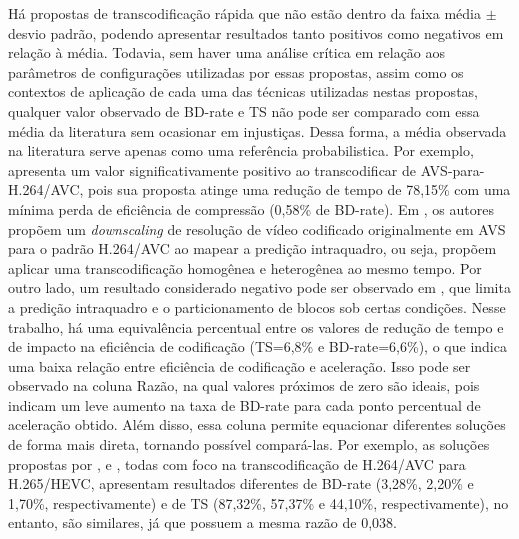 Há propostas de transcodificação rápida que não estão dentro da faixa média $\pm$ desvio padrão, podendo apresentar resultados tanto positivos como negativos em relação à média. Todavia, sem haver uma análise crítica em relação aos parâmetros de configurações utilizadas por essas propostas, assim como os contextos de aplicação de cada uma das técnicas utilizadas nestas propostas, qualquer valor observado de BD-rate e TS não pode ser comparado com essa média da literatura sem ocasionar em injustiças. Dessa forma, a média observada na literatura serve apenas como uma referência probabilistica. Por exemplo, \citet{bib:jin_2011} apresenta um valor significativamente positivo ao transcodificar de AVS-para-H.264/AVC, pois sua proposta atinge uma redução de tempo de 78,15\% com uma mínima perda de eficiência de compressão (0,58\% de BD-rate). Em \citet{bib:jin_2011}, os autores propõem um \textit{downscaling} de resolução de vídeo codificado originalmente em AVS para o padrão H.264/AVC ao mapear a predição intraquadro, ou seja, propõem aplicar uma transcodificação homogênea e heterogênea ao mesmo tempo. Por outro lado, um resultado considerado negativo pode ser observado em \citet{bib:leuven_2011}, que limita a predição intraquadro e o particionamento de blocos sob certas condições. Nesse trabalho, há uma equivalência percentual entre os valores de redução de tempo e de impacto na eficiência de codificação (TS=6,8\% e BD-rate=6,6\%), o que indica uma baixa relação entre eficiência de codificação e aceleração. Isso pode ser observado na coluna Razão, na qual valores próximos de zero são ideais, pois indicam um leve aumento na taxa de BD-rate para cada ponto percentual de aceleração obtido. Além disso, essa coluna permite equacionar diferentes soluções de forma mais direta, tornando possível compará-las. Por exemplo, as soluções propostas por \citet{bib:franche_2015}, \citet{bib:honrubia_2016} e \citet{bib:correa_2016}, todas com foco na transcodificação de H.264/AVC para H.265/HEVC, apresentam resultados diferentes de BD-rate (3,28\%, 2,20\% e 1,70\%, respectivamente) e de TS (87,32\%, 57,37\% e 44,10\%, respectivamente), no entanto, são similares, já que possuem a mesma razão de 0,038.

